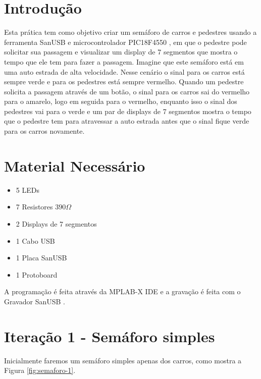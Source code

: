 \section{Introdução}\label{introduuxe7uxe3o}

Esta prática tem como objetivo criar um semáforo de carros e pedestres
usando a ferramenta SanUSB \cite{sanusb-mplabx:11} e microcontrolador
PIC18F4550 \cite{microchip-pic18f4550}, em que o pedestre pode solicitar
sua passagem e visualizar um display de 7 segmentos que mostra o tempo
que ele tem para fazer a passagem. Imagine que este semáforo está em uma
auto estrada de alta velocidade. Nesse cenário o sinal para os carros
está sempre verde e para os pedestres está sempre vermelho. Quando um
pedestre solicita a passagem através de um botão, o sinal para os carros
sai do vermelho para o amarelo, logo em seguida para o vermelho,
enquanto isso o sinal dos pedestres vai para o verde e um par de
displays de 7 segmentos mostra o tempo que o pedestre tem para
atravessar a auto estrada antes que o sinal fique verde para os carros
novamente.

\section{Material Necessário}\label{material-necessuxe1rio}

\begin{itemize}
\itemsep1pt\parskip0pt
\item
  5 LEDs
\item
  7 Resistores $390 \Omega$
\item
  2 Displays de 7 segmentos
\item
  1 Cabo USB
\item
  1 Placa SanUSB
\item
  1 Protoboard
\end{itemize}

A programação é feita através da MPLAB-X IDE \cite{mplabx-ide} e a
gravação é feita com o Gravador SanUSB \cite{gravador-sanusb}.

\section{Iteração 1 - Semáforo
simples}\label{iterauxe7uxe3o-1---semuxe1foro-simples}

Inicialmente faremos um semáforo simples apenas dos carros, como mostra
a Figura \ref{fig:semaforo-1}.

